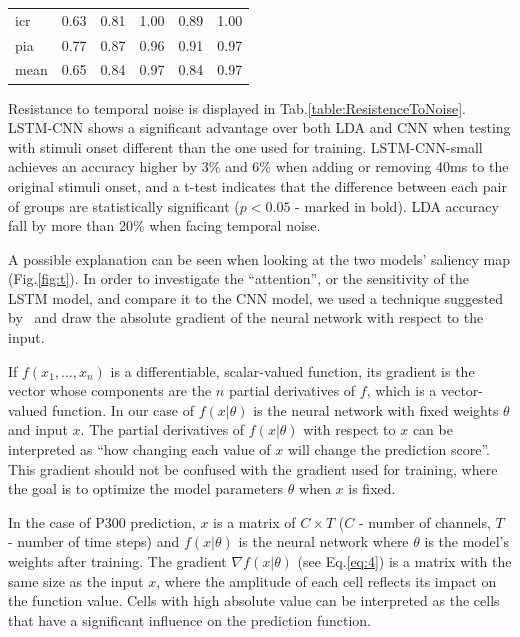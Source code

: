 \documentclass[
12pt, %
english, %
doublespacing, %
headsepline, %
]{MastersDoctoralThesis} %
\begin{document}
\begin{table}[t]
\begin{tabular}{l|ccccc}
		icr     &                  0.63 &                  0.81 &                            1.00 &                             0.89 &                                               1.00 \\
		pia     &                  0.77 &                  0.87 &                            0.96 &                             0.91 &                                               0.97 \\
		mean    &                  0.65 &                  0.84 &                            0.97 &                             0.84 &                                               0.97 \\
		\bottomrule
	\end{tabular}
\end{table}

\vspace{5mm}

Resistance to temporal noise is displayed in Tab.\ref{table:ResistenceToNoise}. LSTM-CNN shows a significant advantage over both LDA and CNN when testing with stimuli onset different than the one used for training. LSTM-CNN-small achieves an accuracy higher by 3\% and 6\% when adding or removing 40ms to the original stimuli onset, and a t-test indicates that the difference between each pair of groups are statistically significant ($p < 0.05$ - marked in bold). LDA accuracy fall by more than 20\% when facing temporal noise.

A possible explanation can be seen when looking at the two models' saliency map (Fig.\ref{fig:t}). In order to investigate the ``attention'', or the sensitivity of the LSTM model, and compare it to the CNN model, we used a technique suggested by~\cite{graves2012supervised} and draw the absolute gradient of the neural network with respect to the input.

If $f(x_{1}, ..., x_{n})$ is a differentiable, scalar-valued function, its gradient is the vector whose components are the $n$ partial derivatives of $f$, which is a vector-valued function. In our case of $f(x|\theta)$ is the neural network with fixed weights $\theta$ and input $x$. The partial derivatives of $f(x|\theta)$ with respect to $x$ can be interpreted as ``how changing each value of $x$ will change the prediction score''. This gradient should not be confused with the gradient used for training, where the goal is to optimize the model parameters $\theta$ when $x$ is fixed.


	In the case of P300 prediction, $x$ is a matrix of $C\times{T}$ ($C$ - number of channels, $T$ - number of time steps) and $f(x|\theta)$ is the neural network where $\theta$ is the model's weights after training. The gradient $\nabla{f(x|\theta)}$ (see Eq.\ref{eq:4}) is a matrix with the same size as the input $x$, where the amplitude of each cell reflects its impact on the function value. Cells with high absolute value can be interpreted as the cells that have a significant influence on the prediction function.
	
\end{document}
